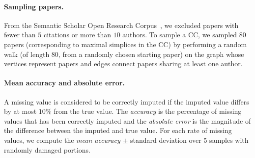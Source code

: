 \paragraph{Sampling papers.}
From the Semantic Scholar Open Research Corpus~\cite{ammar18NAACL}, we excluded papers with fewer than $5$ citations or more than $10$ authors.
To sample a CC, we sampled $80$ papers (corresponding to maximal simplices in the CC) by performing a random walk (of length $80$, from a randomly chosen starting paper) on the graph whose vertices represent papers and edges connect papers sharing at least one author.

\paragraph{Mean accuracy and absolute error.}
A missing value is considered to be correctly imputed if the imputed value differs by at most $10\%$ from the true value.
The \emph{accuracy} is the percentage of missing values that has been correctly imputed and the \emph{absolute error} is the magnitude of the difference between the imputed and true value.
For each rate of missing values, we compute the \emph{mean accuracy} $\pm$ standard deviation over 5 samples with randomly damaged portions.
